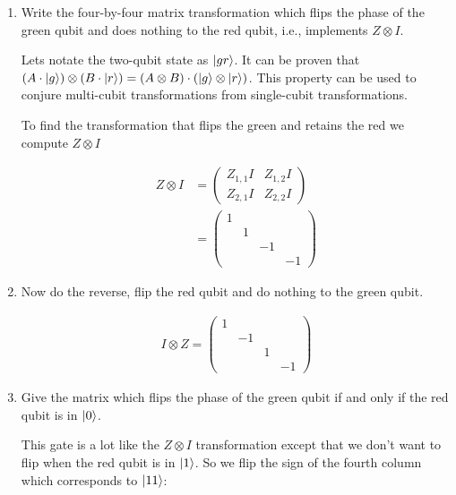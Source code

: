 \documentclass[12pt]{article}
\newcommand{\pmat}[1]{\begin{pmatrix}#1\end{pmatrix}}
\newenvironment{answer}{\begingroup\setlength{\leftskip}{-\leftmargin}\begin{framed}}{\end{framed}\endgroup}
\begin{document}
\begin{enumerate}
    \item Write the four-by-four matrix transformation which flips the phase of the green qubit and does nothing to the red qubit, i.e., implements $Z \otimes I$.

    \begin{answer}
        Lets notate the two-qubit state as $\ket{gr}$. It can be proven that $\left(A \cdot \ket{g}\right) \otimes \left(B \cdot \ket{r}\right) = \left(A \otimes B\right) \cdot \left(\ket{g} \otimes \ket{r}\right)$. This property can be used to conjure multi-cubit transformations from single-cubit transformations.

        To find the transformation that flips the green and retains the red we compute $Z \otimes I$

        \begin{align*}
            Z \otimes I
                &= \left(\begin{array}{c|c}
                    Z_{1,1}I & Z_{1,2}I \\\hline
                    Z_{2,1}I & Z_{2,2}I
                \end{array}\right) \\
                &= \pmat{1&&&\\&1&&\\&&-1&\\&&&-1}
        \end{align*}
    \end{answer}

    \item Now do the reverse, flip the red qubit and do nothing to the green qubit.

    \begin{answer}
        \begin{align*}
            I \otimes Z = \pmat{1&&&\\&-1&&\\&&1&\\&&&-1}
        \end{align*}
    \end{answer}

    \item Give the matrix which flips the phase of the green qubit if and only if the red qubit is in $\ket{0}$.

    \begin{answer}
        This gate is a lot like the $Z \otimes I$ transformation except that we don't want to flip when the red qubit is in $\ket{1}$. So we flip the sign of the fourth column which corresponds to $\ket{11}$:


\end{answer}
\end{enumerate}
\end{document}

